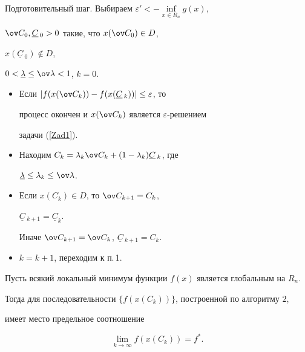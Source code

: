 \begin{algor}


Подготовительный шаг. Выбираем $\varepsilon'<-\inf\limits_{x\in R_n}g(x)$, 


$\ov C_0,\underline C\,_0>0$ такие, что $x(\ov C_0)\in D$, 


$x(\underline C\,_0)\notin D$,


$0<\underline\lambda\leq\ov\lambda<1$, $k=0$.


\begin{itemize}


\item[1.] Если $|f(x(\ov C_k))-f(x(\underline C\,_k))|\leq\varepsilon$, то


процесс окончен и $x(\ov C_k)$ является $\varepsilon$-решением


задачи (\ref{Zad1}).


\item[2.] Находим $C_k=\lambda_k\ov C_k+(1-\lambda_k)\underline C\,_k$, где 


$\underline\lambda\leq\lambda_k\leq\ov\lambda$.


\item[3.] Если $x(C_k)\in D$, то $\ov C_{k+1}=C_k$, 


$\underline C\,_{k+1}=\underline C_k$. 


Иначе $\ov C_{k+1}=\ov C_k$, $\underline C\,_{k+1}=C_k$.


\item[4.] $k=k+1$, переходим к п.\,1. 


\end{itemize}


\end{algor}





\begin{thm}\label{sh}


Пусть всякий локальный минимум функции $f(x)$ является глобальным на $R_n.$


Тогда для последовательности $\{f(x(C_k))\}$, построенной по алгоритму $2$,


имеет место предельное соотношение


$$


\lim_{k\to\infty}f(x(C_k))=f^*. 


$$


\end{thm}





